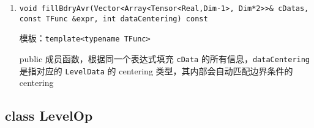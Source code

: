 \documentclass[cn, bibend=bibtex]{elegantpaper}
\theoremstyle{plain}
\begin{document}
\begin{itemize}
\begin{enumerate}
    \item \lstinline|void fillBdryAvr(Vector<Array<Tensor<Real,Dim-1>, Dim*2>>& cDatas, const TFunc &expr, int dataCentering) const|
    
    模板：\lstinline|template<typename TFunc>|

    public 成员函数，根据同一个表达式填充 \lstinline|cData| 的所有信息，\lstinline|dataCentering| 是指对应的 \lstinline|LevelData| 的 centering 类型，其内部会自动匹配边界条件的 centering






  \end{enumerate}
\end{itemize}

\subsection{class LevelOp}
\end{document}
